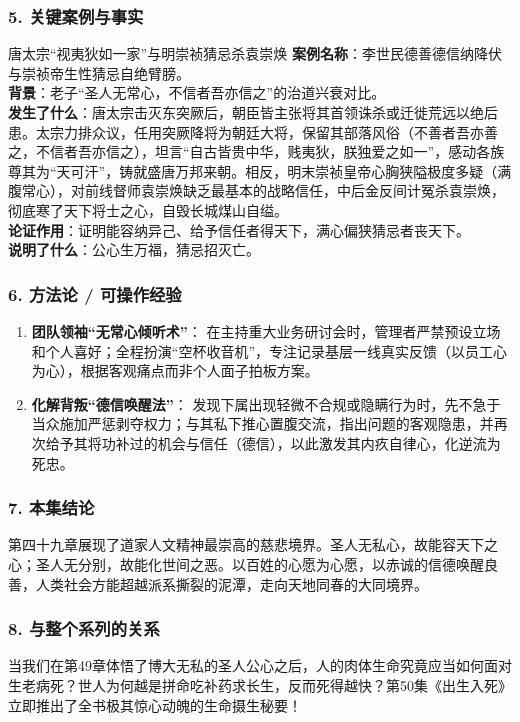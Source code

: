 \subsubsection{5. 关键案例与事实}
\begin{CaseBox}{唐太宗“视夷狄如一家”与明崇祯猜忌杀袁崇焕}
\textbf{案例名称}：李世民德善德信纳降伏与崇祯帝生性猜忌自绝臂膀。\\
\textbf{背景}：老子“圣人无常心，不信者吾亦信之”的治道兴衰对比。\\
\textbf{发生了什么}：唐太宗击灭东突厥后，朝臣皆主张将其首领诛杀或迁徙荒远以绝后患。太宗力排众议，任用突厥降将为朝廷大将，保留其部落风俗（不善者吾亦善之，不信者吾亦信之），坦言“自古皆贵中华，贱夷狄，朕独爱之如一”，感动各族尊其为“天可汗”，铸就盛唐万邦来朝。相反，明末崇祯皇帝心胸狭隘极度多疑（满腹常心），对前线督师袁崇焕缺乏最基本的战略信任，中后金反间计冤杀袁崇焕，彻底寒了天下将士之心，自毁长城煤山自缢。\\
\textbf{论证作用}：证明能容纳异己、给予信任者得天下，满心偏狭猜忌者丧天下。\\
\textbf{说明了什么}：公心生万福，猜忌招灭亡。
\end{CaseBox}

\subsubsection{6. 方法论 / 可操作经验}
\begin{enumerate}
    \item \textbf{团队领袖“无常心倾听术”}：
    在主持重大业务研讨会时，管理者严禁预设立场和个人喜好；全程扮演“空杯收音机”，专注记录基层一线真实反馈（以员工心为心），根据客观痛点而非个人面子拍板方案。
    \item \textbf{化解背叛“德信唤醒法”}：
    发现下属出现轻微不合规或隐瞒行为时，先不急于当众施加严惩剥夺权力；与其私下推心置腹交流，指出问题的客观隐患，并再次给予其将功补过的机会与信任（德信），以此激发其内疚自律心，化逆流为死忠。
\end{enumerate}

\subsubsection{7. 本集结论}
第四十九章展现了道家人文精神最崇高的慈悲境界。圣人无私心，故能容天下之心；圣人无分别，故能化世间之恶。以百姓的心愿为心愿，以赤诚的信德唤醒良善，人类社会方能超越派系撕裂的泥潭，走向天地同春的大同境界。

\subsubsection{8. 与整个系列的关系}
当我们在第49章体悟了博大无私的圣人公心之后，人的肉体生命究竟应当如何面对生老病死？世人为何越是拼命吃补药求长生，反而死得越快？第50集《出生入死》立即推出了全书极其惊心动魄的生命摄生秘要！

